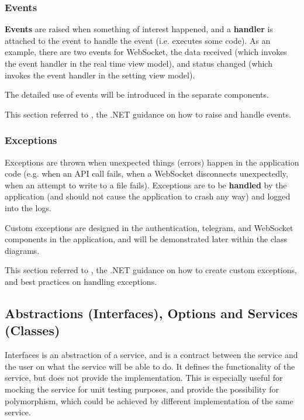\subsubsection{Events}

\textbf{Events} are raised when something of interest happened, and a \textbf{handler} is attached to the event to handle the event (i.e. executes some code). As an example, there are two events for WebSocket, the data received (which invokes the event handler in the real time view model), and status changed (which invokes the event handler in the setting view model).

The detailed use of events will be introduced in the separate components.

This section referred to \autocite{dotnet-tutorial-events}, the .NET guidance on how to raise and handle events.

\subsubsection{Exceptions}

Exceptions are thrown when unexpected things (errors) happen in the application code (e.g. when an API call fails, when a WebSocket disconnects unexpectedly, when an attempt to write to a file fails). Exceptions are to be \textbf{handled} by the application (and should not cause the application to crash any way) and logged into the logs.

Custom exceptions are designed in the authentication, telegram, and WebSocket components in the application, and will be demonstrated later within the class diagrams.

This section referred to \autocite{dotnet-tutorial-exception}, the .NET guidance on how to create custom exceptions, and best practices on handling exceptions.

\subsection{Abstractions (Interfaces), Options and Services (Classes)}

Interfaces is an abstraction of a service, and is a contract between the service and the user on what the service will be able to do. It defines the functionality of the service, but does not provide the implementation. This is especially useful for mocking the service for unit testing purposes, and provide the possibility for polymorphism, which could be achieved by different implementation of the same service.

